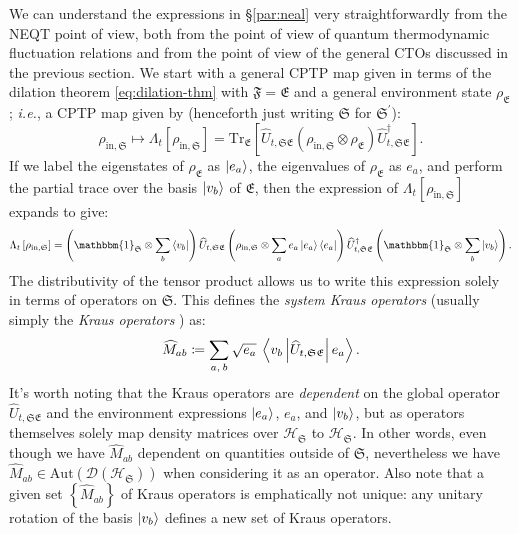 \documentclass[preprints,article,accept,moreauthors,pdftex]{Definitions/mdpi}
\begin{document}
\begin{paracol}{2}
We can understand the expressions in \S\ref{par:neal} very straightforwardly from the NEQT point of view, both from the point of view of quantum thermodynamic fluctuation relations \cite{Goold15, GCGPVP17} and from the point of view of the general CTOs discussed in the previous section. We start with a general CPTP map given in terms of the dilation theorem \eqref{eq:dilation-thm} with $\mathfrak{F} = \mathfrak{E}$ and a general environment state $\rho_{\mathfrak{E}}$; \emph{i.e.}, a CPTP map given by (henceforth just writing $\mathfrak{S}$ for $\mathfrak{S}^{\prime}$): \begin{equation}
    \label{eq:general-CPTP-map}
    \rho_{\mathrm{in},\mathfrak{S}} \mapsto \Lambda_{t}\left[\rho_{\mathrm{in},\mathfrak{S}}\right] = \mathrm{Tr}_{\mathfrak{E}}\left[\widehat{U}_{t,\mathfrak{SE}}\left(\rho_{\mathrm{in},\mathfrak{S}}\otimes\rho_{\mathfrak{E}}\right)\widehat{U}_{t,\mathfrak{SE}}^{\dagger}\right].
\end{equation}
If we label the eigenstates of $\rho_{\mathfrak{E}}$ as $\ket{e_{a}}$, the eigenvalues of $\rho_{\mathfrak{E}}$ as $e_{a}$, and perform the partial trace over the basis $\ket{v_{b}}$ of $\mathfrak{E}$, then the expression of $\Lambda_{t}\left[\rho_{\mathrm{in},\mathfrak{S}}\right]$ expands to give:
\begin{equation}
    \label{eq:Kraus-CPTP-map}
    \Lambda_{t}\left[\rho_{\mathrm{in},\mathfrak{S}}\right] = \left(\mathbbm{1}_{\mathfrak{S}} \otimes \sum_{b} \bra{v_{b}}\right) \widehat{U}_{t,\mathfrak{SE}}\left(\rho_{\mathrm{in},\mathfrak{S}}\otimes\sum_{a}e_{a}\ket{e_{a}}\bra{e_{a}}\right)\widehat{U}_{t,\mathfrak{SE}}^{\dagger}\left(\mathbbm{1}_{\mathfrak{S}} \otimes \sum_{b} \ket{v_{b}}\right).
\end{equation}
The distributivity of the tensor product allows us to write this expression solely in terms of operators on $\mathfrak{S}$. This defines the \emph{system Kraus operators} (usually simply the \emph{Kraus operators} \cite{Kraus71}) as:
\begin{equation}
    \label{eq:syst-Kraus-op}
    \widehat{M}_{ab}\coloneqq \sum_{a,\:b}
    \sqrt{e_{a}}\:\Braket{v_{b}|\!\widehat{U}_{t,\mathfrak{SE}}\!|e_{a}}.
\end{equation}
It's worth noting that the Kraus operators are \emph{dependent} on the global operator $\widehat{U}_{t,\mathfrak{SE}}$ and the environment expressions $\ket{e_{a}}$, $e_{a}$, and $\ket{v_{b}}$, but as operators themselves solely map density matrices over $\mathcal{H}_{\mathfrak{S}}$ to $\mathcal{H}_{\mathfrak{S}}$. In other words, even though we have $\widehat{M}_{ab}$ dependent on quantities outside of $\mathfrak{S}$, nevertheless we have $\widehat{M}_{ab}\in\mathrm{Aut}\left(\mathcal{D}\left(\mathcal{H}_{\mathfrak{S}}\right)\right)$ when considering it as an operator. Also note that a given set $\left\{\widehat{M}_{ab}\right\}$ of Kraus operators is emphatically not unique: any unitary rotation of the basis $\ket{v_{b}}$ defines a new set of Kraus operators.


\end{paracol}
\end{document}
